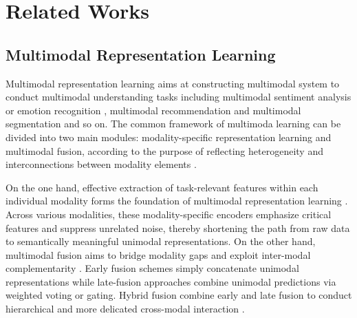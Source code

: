 \documentclass{article}
\begin{document}



{
% 


}



\newpage
\appendix

\section{Related Works}
\label{appendix_relatedwork}
\subsection{Multimodal Representation Learning}
Multimodal representation learning aims at constructing multimodal system to conduct multimodal understanding tasks including multimodal sentiment analysis \cite{hazarika2020misa,han2021improving,lin2023mtmd,zhang2023learning,xiao2024neuroinspired} or emotion recognition \cite{hu2022unimse,li2023joyful,lin2024semanticmac,cheng2024emotionllama}, multimodal recommendation \cite{li2025generating} and multimodal segmentation \cite{pipoli2025imfuse} and so on. The common framework of multimoda learning can be divided into two main modules: modality-specific representation learning and multimodal fusion, according to the purpose of reflecting heterogeneity and interconnections between modality elements \cite{liang2024foundations}. 

On the one hand, effective extraction of task-relevant features within each individual modality forms the foundation of multimodal representation learning \cite{lian2024merbench,lin2024semanticmac}. Across various modalities, these modality-specific encoders emphasize critical features and suppress unrelated noise, thereby shortening the path from raw data to semantically meaningful unimodal representations. On the other hand, multimodal fusion aims to bridge modality gaps and exploit inter-modal complementarity \cite{gkoumas2021makes,liang2024foundations}. Early fusion schemes simply concatenate unimodal representations  while late-fusion approaches combine unimodal predictions via weighted voting or gating. Hybrid fusion combine early and late fusion to conduct hierarchical and more delicated cross-modal interaction \cite{zhao2024deep}.
\end{document}
